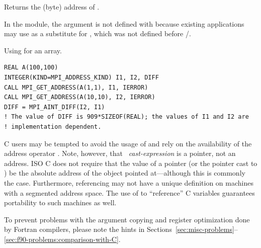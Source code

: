 Returns the (byte) address of .

\begin{rationale}
In the  module, the  argument is not defined
with  because existing applications may use
 as a
substitute for , which was not defined before \MPIIIIDOTO/.
\end{rationale}

\begin{example}
\label{pt2pt-exW}
%
Using  for an array.

\begin{lstlisting}[language={[MPI]Fortran}]
REAL A(100,100)
INTEGER(KIND=MPI_ADDRESS_KIND) I1, I2, DIFF
CALL MPI_GET_ADDRESS(A(1,1), I1, IERROR)
CALL MPI_GET_ADDRESS(A(10,10), I2, IERROR)
DIFF = MPI_AINT_DIFF(I2, I1)
! The value of DIFF is 909*SIZEOF(REAL); the values of I1 and I2 are
! implementation dependent.
\end{lstlisting}
\end{example}

\begin{users}
C users may be tempted to avoid the usage of
and rely on
the availability of the address operator \code{\&}.  Note, however, that
\code{\&}~\emph{cast-expression} is a pointer, not an
address.
ISO C
does not require that the value of a pointer
(or the pointer cast to ) be
the absolute address of the object pointed at---although this is
commonly the case.
Furthermore, referencing may not have a unique
definition on machines with a segmented address space.
The use of
to ``reference'' C
variables guarantees portability to such machines as well.
\end{users}

\begin{users}
  To prevent problems with the argument copying and register optimization done
  by Fortran compilers, please note the hints in
Sections~\ref{sec:misc-problems}--\ref{sec:f90-problems:comparison-with-C}.
\end{users}

